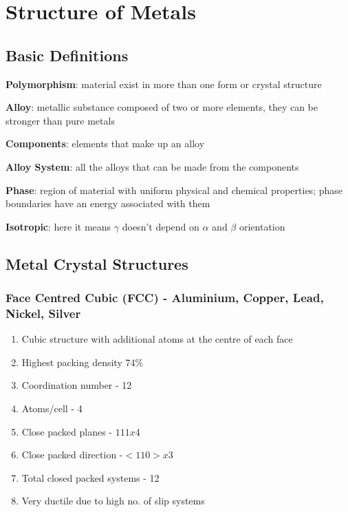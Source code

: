 \section{Structure of Metals}
\subsection{Basic Definitions}

\textbf{Polymorphism}: material exist in more than one form or crystal structure

\textbf{Alloy}: metallic substance composed of two or more elements, they can be stronger than pure metals

\textbf{Components}: elements that make up an alloy

\textbf{Alloy System}: all the alloys that can be made from the components

\textbf{Phase}: region of material with uniform physical and chemical properties; phase boundaries have an energy associated with them

\textbf{Isotropic}: here it means $\gamma$ doesn't depend on $\alpha$ and $\beta$ orientation

\subsection{Metal Crystal Structures} %
\label{sub:metal_crystal_structures}


\subsubsection{Face Centred Cubic (FCC) - Aluminium, Copper, Lead, Nickel, Silver}
\begin{enumerate}
  \item Cubic structure with additional atoms at the centre of each face
  \item Highest packing density $74\%$
  \item Coordination number - 12
  \item Atoms/cell - 4
  \item Close packed planes - ${111} x 4$
  \item Close packed direction -$ <110> x 3$
  \item Total closed packed systems - 12
  \item Very ductile due to high no. of slip systems
\end{enumerate}

